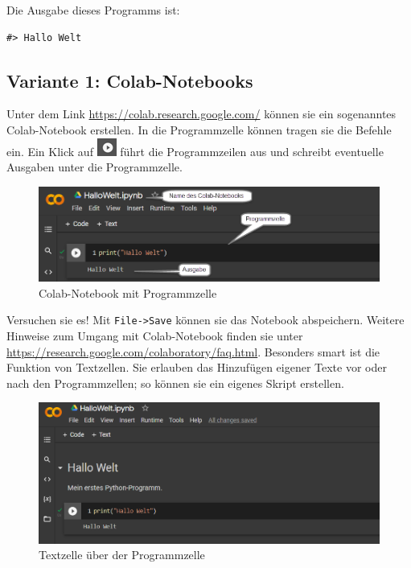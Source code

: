 \documentclass[
  oneside]{book}
\begin{document}
Die Ausgabe dieses Programms ist:

\begin{verbatim}
#> Hallo Welt
\end{verbatim}

\hypertarget{variante-1-colab-notebooks}{%
\subsection*{Variante 1: Colab-Notebooks}\label{variante-1-colab-notebooks}}

Unter dem Link \url{https://colab.research.google.com/} können sie ein sogenanntes Colab-Notebook erstellen. In die Programmzelle können tragen sie die Befehle ein. Ein Klick auf \includegraphics{01-python.assets/image-20220220185350019.png} führt die Programmzeilen aus und schreibt eventuelle Ausgaben unter die Programmzelle.

\begin{figure}
\centering
\includegraphics[width=1\textwidth,height=\textheight]{01-python.assets/image-20220220185808467.png}
\caption{Colab-Notebook mit Programmzelle}
\end{figure}

Versuchen sie es! Mit \texttt{File-\textgreater{}Save} können sie das Notebook abspeichern. Weitere Hinweise zum Umgang mit Colab-Notebook finden sie unter \url{https://research.google.com/colaboratory/faq.html}. Besonders smart ist die Funktion von Textzellen. Sie erlauben das Hinzufügen eigener Texte vor oder nach den Programmzellen; so können sie ein eigenes Skript erstellen.

\begin{figure}
\centering
\includegraphics[width=1\textwidth,height=\textheight]{01-python.assets/image-20220220190605212.png}
\caption{Textzelle über der Programmzelle}
\end{figure}
\end{document}

